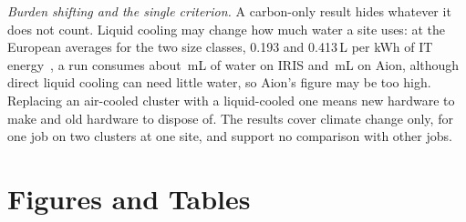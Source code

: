 \documentclass[conference,a4paper]{IEEEtran}
\begin{document}
\emph{Burden shifting and the single criterion.} A carbon-only result hides
whatever it does not count. Liquid cooling may change how much water a site
uses: at the European averages for the two size classes, 0.193 and 0.413\,L per
kWh of IT energy~\cite{ec2025}, a run consumes about \IrisWater\,mL of water on
IRIS and \AionWater\,mL on Aion, although direct liquid cooling can need little
water, so Aion's figure may be too high. Replacing an air-cooled cluster with a
liquid-cooled one means new hardware to make and old hardware to dispose of. The
results cover climate
change only, for one job on two clusters at one site, and support no comparison
with other jobs.

\clearpage




\onecolumn
\appendices
\section{Figures and Tables}\label{app:figures}
\end{document}
